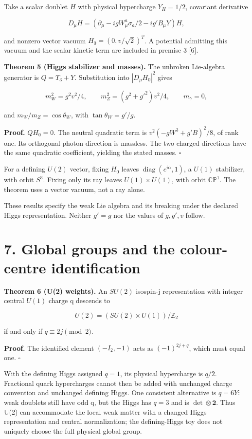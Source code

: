 \documentclass[
  11pt,
  a4paper,
]{article}
\begin{document}
Take a scalar doublet \(H\) with physical hypercharge \(Y_H=1/2\), covariant derivative

\[
 D_\mu H=(\partial_\mu-igW_\mu^a\sigma_a/2-ig'B_\mu Y)H,
\]

and nonzero vector vacuum \(H_0=(0,v/\sqrt2)^T\). A potential admitting this vacuum and the scalar kinetic term are included in premise 3 {[}6{]}.

\textbf{Theorem 5 (Higgs stabilizer and masses).} The unbroken Lie-algebra generator is \(Q=T_3+Y\). Substitution into \(|D_\mu H_0|^2\) gives

\[
 m_W^2=g^2v^2/4,\qquad m_Z^2=(g^2+g'^2)v^2/4,\qquad m_\gamma=0,
\]

and \(m_W/m_Z=\cos\theta_W\), with \(\tan\theta_W=g'/g\).

\textbf{Proof.} \(QH_0=0\). The neutral quadratic term is \(v^2(-gW^3+g'B)^2/8\), of rank one. Its orthogonal photon direction is massless. The two charged directions have the same quadratic coefficient, yielding the stated masses. \(\square\)

For a defining \(U(2)\) vector, fixing \(H_0\) leaves \(\operatorname{diag}(e^{i\alpha},1)\), a \(U(1)\) stabilizer, with orbit \(S^3\). Fixing only its ray leaves \(U(1)\times U(1)\), with orbit \(\mathbb{CP}^1\). The theorem uses a vector vacuum, not a ray alone.

These results specify the weak Lie algebra and its breaking under the declared Higgs representation. Neither \(g'=g\) nor the values of \(g,g',v\) follow.

\section{7. Global groups and the colour-centre identification}\label{global-groups-and-the-colour-centre-identification}

\textbf{Theorem 6 (U(2) weights).} An \(SU(2)\) isospin-j representation with integer central \(U(1)\) charge q descends to

\[
 U(2)=(SU(2)\times U(1))/\mathbb Z_2
\]

if and only if \(q\equiv2j\pmod2\).

\textbf{Proof.} The identified element \((-I_2,-1)\) acts as \((-1)^{2j+q}\), which must equal one. \(\square\)

With the defining Higgs assigned \(q=1\), its physical hypercharge is \(q/2\). Fractional quark hypercharges cannot then be added with unchanged charge convention and unchanged defining Higgs. One consistent alternative is \(q=6Y\): weak doublets still have odd q, but the Higgs has \(q=3\) and is \(\det\otimes\mathbf2\). Thus U(2) can accommodate the local weak matter with a changed Higgs representation and central normalization; the defining-Higgs toy does not uniquely choose the full physical global group.
\end{document}
